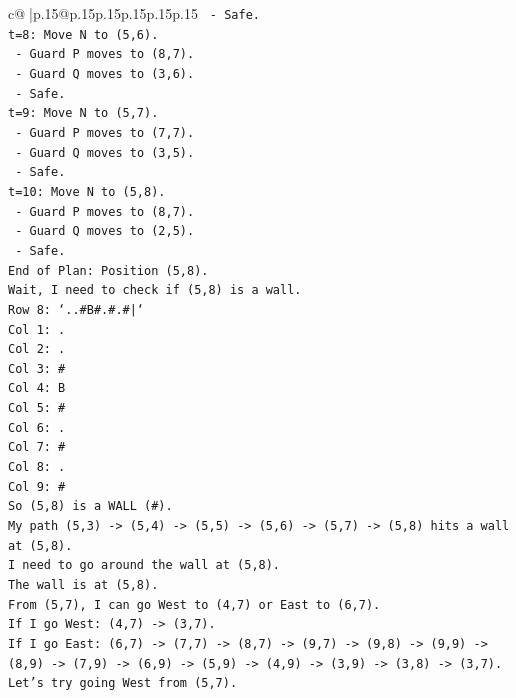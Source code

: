 \documentclass{article}
\begin{document}
{\begin{supertabular}{c@{$\;$}|p{.15\linewidth}@{}p{.15\linewidth}p{.15\linewidth}p{.15\linewidth}p{.15\linewidth}p{.15\linewidth}}
{{{\texttt{  {-} Safe.} \\
\texttt{t=8: Move N to (5,6).} \\
\texttt{  {-} Guard P moves to (8,7).} \\
\texttt{  {-} Guard Q moves to (3,6).} \\
\texttt{  {-} Safe.} \\
\texttt{t=9: Move N to (5,7).} \\
\texttt{  {-} Guard P moves to (7,7).} \\
\texttt{  {-} Guard Q moves to (3,5).} \\
\texttt{  {-} Safe.} \\
\texttt{t=10: Move N to (5,8).} \\
\texttt{  {-} Guard P moves to (8,7).} \\
\texttt{  {-} Guard Q moves to (2,5).} \\
\texttt{  {-} Safe.} \\
\texttt{End of Plan: Position (5,8).} \\
\texttt{Wait, I need to check if (5,8) is a wall.} \\
\texttt{Row 8: `..\#B\#.\#.\#|`} \\
\texttt{Col 1: .} \\
\texttt{Col 2: .} \\
\texttt{Col 3: \#} \\
\texttt{Col 4: B} \\
\texttt{Col 5: \#} \\
\texttt{Col 6: .} \\
\texttt{Col 7: \#} \\
\texttt{Col 8: .} \\
\texttt{Col 9: \#} \\
\texttt{So (5,8) is a WALL (\#).} \\
\texttt{My path (5,3) {-}> (5,4) {-}> (5,5) {-}> (5,6) {-}> (5,7) {-}> (5,8) hits a wall at (5,8).} \\
\texttt{I need to go around the wall at (5,8).} \\
\texttt{The wall is at (5,8).} \\
\texttt{From (5,7), I can go West to (4,7) or East to (6,7).} \\
\texttt{If I go West: (4,7) {-}> (3,7).} \\
\texttt{If I go East: (6,7) {-}> (7,7) {-}> (8,7) {-}> (9,7) {-}> (9,8) {-}> (9,9) {-}> (8,9) {-}> (7,9) {-}> (6,9) {-}> (5,9) {-}> (4,9) {-}> (3,9) {-}> (3,8) {-}> (3,7).} \\
\texttt{Let's try going West from (5,7).} \\
}}}
\end{supertabular}}
\end{document}
